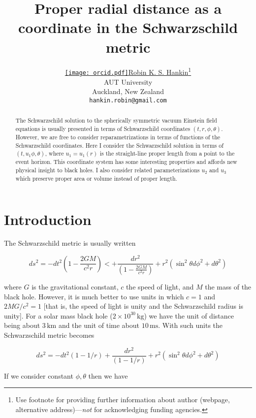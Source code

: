 \documentclass{article}
\title{Proper radial distance as a coordinate in the Schwarzschild metric}
\author{ \href{https://orcid.org/0000-0000-0000-0000}{\texttt{[image: orcid.pdf]}\hspace{1mm}Robin K. S. Hankin}\thanks{Use footnote for providing further
		information about author (webpage, alternative
		address)---\emph{not} for acknowledging funding agencies.} \\
              AUT University\\
              Auckland, New Zealand\\
	\texttt{hankin.robin@gmail.com} \\
}
\begin{document}
\maketitle

\begin{abstract}
The Schwarzschild solution to the spherically symmetric vacuum
Einstein field equations is usually presented in terms of
Schwarzschild coordinates $(t,r,\phi,\theta)$.  However, we are free
to consider reparametrizations in terms of functions of the
Schwarzschild coordinates.  Here I consider the Schwarzschild solution
in terms of $(t,u_1\phi,\theta)$, where $u_1=u_1(r)$ is the
straight-line proper length from a point to the event horizon.  This
coordinate system has some interesting properties and affords new
physical insight to black holes.  I also consider related
parameterizations $u_2$ and $u_3$ which preserve proper area or volume
instead of proper length.
\end{abstract}




\section{Introduction}
The Schwarzschild metric is usually written

\begin{equation}
  ds^2=-dt^2\left(1-\frac{2GM}{c^2r}\right)
<  +\frac{dr^2}{\left(1-\frac{2GM}{c^2r}\right)} + r^2(\sin^2\theta
  d\phi^2 + d\theta^2)
\end{equation}

where $G$ is the gravitational constant, $c$ the speed of light, and
$M$ the mass of the black hole.  However, it is much better to use
units in which $c=1$ and $2MG/c^2=1$ [that is, the speed of light is
  unity and the Schwarzschild radius is unity].  For a solar mass
black hole ($2\times 10^{30}\,\mathrm{kg}$) we have the unit of
distance being about $3\,\mathrm{km}$ and the unit of time about
$10\,\mathrm{ms}$.  With such units the Schwarzschild metric becomes

\begin{equation}
  ds^2=-dt^2\left(1-1/r\right)
  +\frac{dr^2}{\left(1-1/r\right)} + r^2(\sin^2\theta d\phi^2 + d\theta^2)
\end{equation}

If we consider constant $\phi,\theta$ then we have 

\label{sec:headings}
\end{document}
